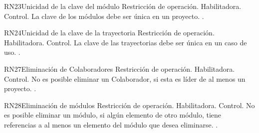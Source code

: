 \begin{BussinesRule}{RN23}{Unicidad de la clave del módulo} 
	\BRitem[Tipo:] Restricción de operación. 
	\BRitem[Clase:] Habilitadora. 
	\BRitem[Nivel:] Control. %
	\BRitem[Descripción:] La clave de los módulos debe ser única en un proyecto.
	 . 
\end{BussinesRule}

\begin{BussinesRule}{RN24}{Unicidad de la clave de la trayectoria} 
	\BRitem[Tipo:] Restricción de operación. 
	\BRitem[Clase:] Habilitadora. 
	\BRitem[Nivel:] Control. %
	\BRitem[Descripción:] La clave de las trayectorias debe ser única en un caso de uso.
	 \UCref{}{}. 
\end{BussinesRule}



\begin{BussinesRule}{RN27}{Eliminación de Colaboradores} 
	\BRitem[Tipo:] Restricción de operación. 
	\BRitem[Clase:] Habilitadora. 
	\BRitem[Nivel:] Control. %
	\BRitem[Descripción:] No es posible eliminar un Colaborador, si esta es líder de al menos un proyecto.
	 . 
\end{BussinesRule}

\begin{BussinesRule}{RN28}{Eliminación de módulos} 
	\BRitem[Tipo:] Restricción de operación. 
	\BRitem[Clase:] Habilitadora. 
	\BRitem[Nivel:] Control. %
	\BRitem[Descripción:] No es posible eliminar un módulo, si algún elemento de otro módulo, tiene referencias a al menos un elemento del módulo que desea eliminarse.
	 . 
\end{BussinesRule}


